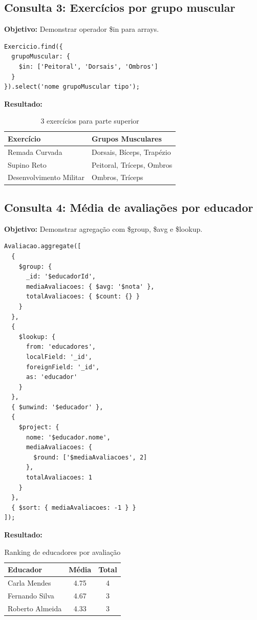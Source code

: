 \documentclass[12pt,a4paper]{article}
\begin{document}
\subsection{Consulta 3: Exercícios por grupo muscular}

\textbf{Objetivo:} Demonstrar operador \$in para arrays.

\begin{lstlisting}[caption=Query 3 - Busca em Arrays]
Exercicio.find({
  grupoMuscular: { 
    $in: ['Peitoral', 'Dorsais', 'Ombros'] 
  }
}).select('nome grupoMuscular tipo');
\end{lstlisting}

\textbf{Resultado:}
\begin{table}[h]
\centering
\begin{tabular}{ll}
\toprule
Exercício & Grupos Musculares \\
\midrule
Remada Curvada & Dorsais, Bíceps, Trapézio \\
Supino Reto & Peitoral, Tríceps, Ombros \\
Desenvolvimento Militar & Ombros, Tríceps \\
\bottomrule
\end{tabular}
\caption{3 exercícios para parte superior}
\end{table}

\subsection{Consulta 4: Média de avaliações por educador}

\textbf{Objetivo:} Demonstrar agregação com \$group, \$avg e \$lookup.

\begin{lstlisting}[caption=Query 4 - Aggregation Framework]
Avaliacao.aggregate([
  {
    $group: {
      _id: '$educadorId',
      mediaAvaliacoes: { $avg: '$nota' },
      totalAvaliacoes: { $count: {} }
    }
  },
  {
    $lookup: {
      from: 'educadores',
      localField: '_id',
      foreignField: '_id',
      as: 'educador'
    }
  },
  { $unwind: '$educador' },
  {
    $project: {
      nome: '$educador.nome',
      mediaAvaliacoes: { 
        $round: ['$mediaAvaliacoes', 2] 
      },
      totalAvaliacoes: 1
    }
  },
  { $sort: { mediaAvaliacoes: -1 } }
]);
\end{lstlisting}

\textbf{Resultado:}
\begin{table}[h]
\centering
\begin{tabular}{lcc}
\toprule
Educador & Média & Total \\
\midrule
Carla Mendes & 4.75 & 4 \\
Fernando Silva & 4.67 & 3 \\
Roberto Almeida & 4.33 & 3 \\
\bottomrule
\end{tabular}
\caption{Ranking de educadores por avaliação}
\end{table}
\end{document}
